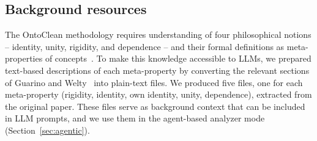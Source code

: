 \documentclass{IOS-Book-Article}
\begin{document}

\subsection{Background resources}

% 
% 
% 

The OntoClean methodology requires understanding of four philosophical
notions -- identity, unity, rigidity, and dependence -- and their
formal definitions as meta-properties of
concepts~\cite{guarino2000formal}.  To make this knowledge accessible
to LLMs, we prepared text-based descriptions of each meta-property by
converting the relevant sections of Guarino and
Welty~\cite{guarino2000formal} into plain-text files.  We produced five
files, one for each meta-property (rigidity, identity, own identity,
unity, dependence), extracted from the original paper.  These files
serve as background context that can be included in LLM prompts, and
we use them in the agent-based analyzer mode (Section~\ref{sec:agentic}).
\end{document}
